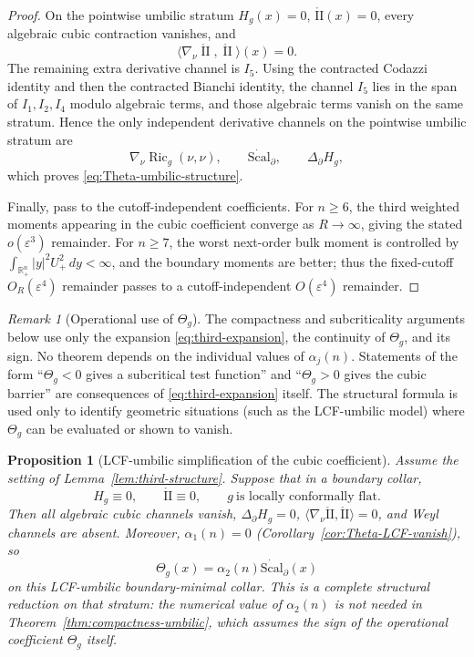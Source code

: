 \documentclass[11pt,reqno,a4paper]{amsart}
\newcommand{\R}{\mathbb{R}}
\DeclareMathOperator{\Ric}{Ric}
\DeclareMathOperator{\II}{II}
\numberwithin{equation}{section}
\theoremstyle{plain}
\newtheorem{proposition}[theorem]{Proposition}
\newcommand{\Scal}{\mathrm{Scal}}
\theoremstyle{remark}
\newtheorem{remark}[theorem]{Remark}
\theoremstyle{plain}
\begin{document}
\begin{proof}
On the pointwise umbilic stratum $H_g(x)=0$, $\mathring{\mathrm{II}}(x)=0$,
every algebraic cubic contraction vanishes, and
\[
\langle\nabla_\nu\mathring{\II},\mathring{\II}\rangle(x)=0.
\]
The remaining extra derivative channel is $I_5$.  Using the contracted Codazzi
identity and then the contracted Bianchi identity, the channel $I_5$ lies in
the span of $I_1,I_2,I_4$ modulo algebraic terms, and those algebraic terms
vanish on the same stratum.  Hence the only independent derivative channels on
the pointwise umbilic stratum are
\[
\nabla_\nu\Ric_g(\nu,\nu),
\qquad
\dot{\Scal}_\partial,
\qquad
\Delta_\partial H_g,
\]
which proves \eqref{eq:Theta-umbilic-structure}.

Finally, pass to the cutoff-independent coefficients.  For $n\ge6$, the third
weighted moments appearing in the cubic coefficient converge as $R\to\infty$,
giving the stated $o(\varepsilon^3)$ remainder.  For $n\ge7$, the worst
next-order bulk moment is controlled by
$\int_{\R^n_+}|y|^2U_+^2\,dy<\infty$, and the boundary moments are better;
thus the fixed-cutoff $O_R(\varepsilon^4)$ remainder passes to a
cutoff-independent $O(\varepsilon^4)$ remainder.
\end{proof}

\begin{remark}[Operational use of $\Theta_g$]\label{rem:Theta-sign-only}
The compactness and subcriticality arguments below use only the expansion
\eqref{eq:third-expansion}, the continuity of $\Theta_g$, and its sign.
No theorem depends on the individual values of $\alpha_j(n)$.  Statements
of the form ``$\Theta_g<0$ gives a subcritical test function'' and
``$\Theta_g>0$ gives the cubic barrier'' are consequences of
\eqref{eq:third-expansion} itself.  The structural formula is used only to
identify geometric situations (such as the LCF-umbilic model) where $\Theta_g$
can be evaluated or shown to vanish.
\end{remark}

\begin{proposition}[LCF-umbilic simplification of the cubic coefficient]
\label{prop:Theta-LCF-umbilic}
Assume the setting of Lemma~\ref{lem:third-structure}.  Suppose that in a
boundary collar,
\[
H_g\equiv0,
\qquad
\mathring{\mathrm{II}}\equiv0,
\qquad
g\ \text{is locally conformally flat}.
\]
Then all algebraic cubic channels vanish, $\Delta_\partial H_g=0$,
$\langle\nabla_\nu\mathring{\mathrm{II}},\mathring{\mathrm{II}}\rangle=0$,
and Weyl channels are absent.
Moreover, $\alpha_1(n)=0$ (Corollary~\ref{cor:Theta-LCF-vanish}), so
\begin{equation}\label{eq:Theta-LCF-reduced}
\Theta_g(x)=\alpha_2(n)\dot{\Scal}_\partial(x)
\end{equation}
on this LCF-umbilic boundary-minimal collar.
This is a complete structural reduction on that stratum: the numerical value
of $\alpha_2(n)$ is not needed in Theorem~\ref{thm:compactness-umbilic},
which assumes the sign of the operational coefficient $\Theta_g$ itself.
\end{proposition}
\end{document}
